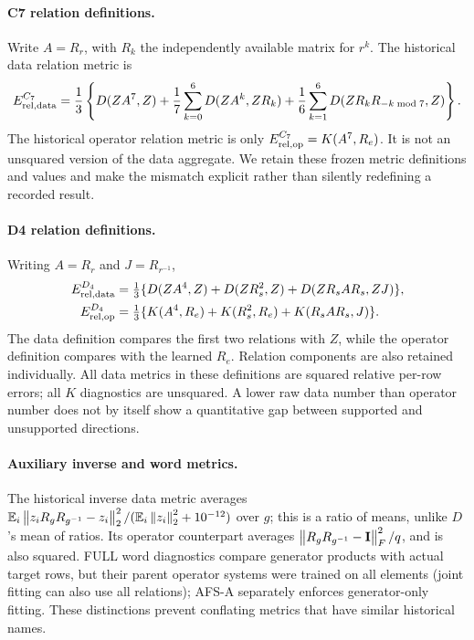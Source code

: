 \paragraph{C7 relation definitions.}
Write $A=R_r$, with $R_k$ the independently available matrix for $r^k$. The historical data relation metric is
\[
 E_{\mathrm{rel,data}}^{C_7}=\frac13\left\{
 D(ZA^7,Z)+\frac17\sum_{k=0}^6D(ZA^k,ZR_k)
 +\frac16\sum_{k=1}^6D(ZR_kR_{-k\bmod7},Z)\right\}.
\]
The historical operator relation metric is only $E_{\mathrm{rel,op}}^{C_7}=K(A^7,R_e)$. It is not an unsquared version of the data aggregate. We retain these frozen metric definitions and values and make the mismatch explicit rather than silently redefining a recorded result.

\paragraph{D4 relation definitions.}
Writing $A=R_r$ and $J=R_{r^{-1}}$,
\begin{align*}
 E_{\mathrm{rel,data}}^{D_4}&=\tfrac13\{D(ZA^4,Z)+D(ZR_s^2,Z)+D(ZR_sAR_s,ZJ)\},\\
 E_{\mathrm{rel,op}}^{D_4}&=\tfrac13\{K(A^4,R_e)+K(R_s^2,R_e)+K(R_sAR_s,J)\}.
\end{align*}
The data definition compares the first two relations with $Z$, while the operator definition compares with the learned $R_e$. Relation components are also retained individually. All data metrics in these definitions are squared relative per-row errors; all $K$ diagnostics are unsquared. A lower raw data number than operator number does not by itself show a quantitative gap between supported and unsupported directions.

\paragraph{Auxiliary inverse and word metrics.}
The historical inverse data metric averages
$\mathbb{E}_{i}\left\lVert z_iR_gR_{g^{-1}}-z_i\right\rVert_2^2/(\mathbb{E}_i\left\lVert z_i\right\rVert_2^2+10^{-12})$ over $g$; this is a ratio of means, unlike $D$'s mean of ratios. Its operator counterpart averages $\left\lVert R_gR_{g^{-1}}-\mathbf{I}\right\rVert_F^2/q$, and is also squared. FULL word diagnostics compare generator products with actual target rows, but their parent operator systems were trained on all elements (joint fitting can also use all relations); AFS-A separately enforces generator-only fitting. These distinctions prevent conflating metrics that have similar historical names.

